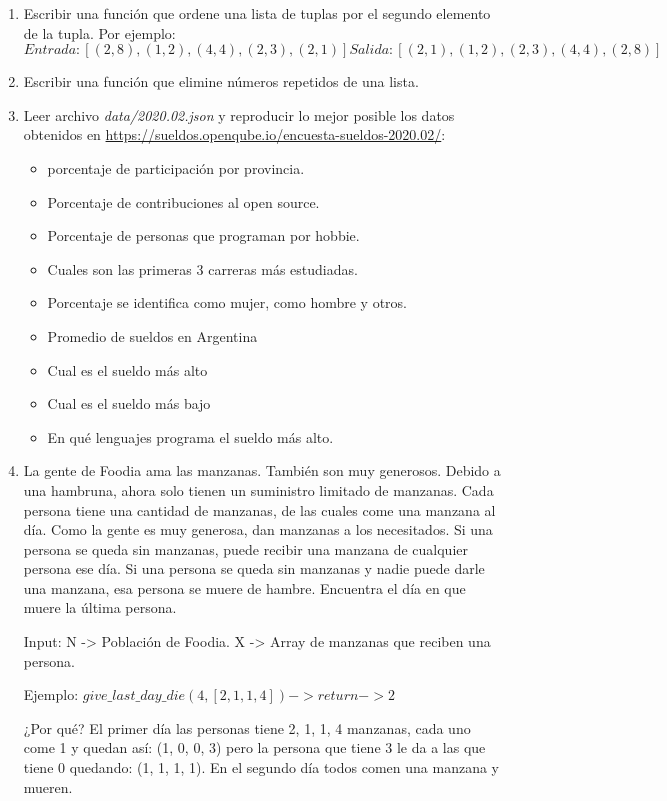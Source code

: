 \documentclass[12pt, spanish]{article}
\begin{document}
\begin{enumerate}
	\item Escribir una función que ordene una lista de tuplas por el segundo elemento de la tupla. Por ejemplo:
	$$Entrada: [(2, 8), (1, 2), (4, 4), (2, 3), (2, 1)]
	Salida: [(2, 1), (1, 2), (2, 3), (4, 4), (2, 8)]$$ 
	\item Escribir una función que elimine números repetidos de una lista.
	\item Leer archivo \textit{data/2020.02.json} y reproducir lo mejor posible los datos obtenidos en \url{https://sueldos.openqube.io/encuesta-sueldos-2020.02/}:
	\begin{itemize}
		\item porcentaje de participación por provincia.
 		\item Porcentaje de contribuciones al open source.
 		\item Porcentaje de personas que programan por hobbie.
 	 	\item Cuales son las primeras 3 carreras más estudiadas.
 	 	\item Porcentaje se identifica como mujer, como hombre y otros.
 	 	\item Promedio de sueldos en Argentina
 	 	\item Cual es el sueldo más alto
 	 	\item Cual es el sueldo más bajo
 	 	\item En qué lenguajes programa el sueldo más alto.
	\end{itemize}
    \item La gente de Foodia ama las manzanas. También son muy generosos. Debido a una hambruna, ahora solo tienen un suministro limitado de manzanas. Cada persona tiene una cantidad de manzanas, de las cuales come una manzana al día. Como la gente es muy generosa, dan manzanas a los necesitados. Si una persona se queda sin manzanas, puede recibir una manzana de cualquier persona ese día. Si una persona se queda sin manzanas y nadie puede darle una manzana, esa persona se muere de hambre. Encuentra el día en que muere la última persona.
    
    Input: N -> Población de Foodia. X -> Array de manzanas que reciben una persona.
    
    Ejemplo: $give\_last\_day\_die(4, [2, 1, 1, 4]) -> return -> 2$
    
    ¿Por qué? El primer día las personas tiene 2, 1, 1, 4 manzanas, cada uno come 1 y quedan así: (1, 0, 0, 3) pero la persona que tiene 3 le da a las que tiene 0 quedando: (1, 1, 1, 1). En el segundo día todos comen una manzana y mueren.
    

\end{enumerate}
\end{document}
